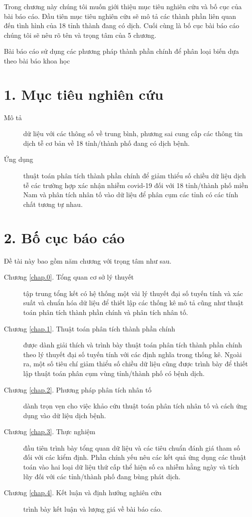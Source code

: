 Trong chương này chúng tôi muốn giới thiệu mục tiêu nghiên cứu và bố cục của bài báo cáo. Đầu tiên mục tiêu nghiên cứu sẽ mô tả các thành phần liên quan đến tình hình của 18 tỉnh thành đang có dịch. Cuối cùng là bố cục bài báo cáo chúng tôi sẽ nêu rõ tên và trọng tâm của 5 chương.

Bài báo cáo sử dụng các phương pháp thành phần chính để phân loại biến dựa theo bài báo khoa học \cite{ref}
\section*{1. Mục tiêu nghiên cứu}

\begin{description}
	\item[Mô tả] dữ liệu với các thông số về trung bình, phương sai cung cấp các thông tin dịch tễ cơ bản về 18 tỉnh/thành phố đang có dịch bệnh.
	\item[Ứng dụng] thuật toán phân tích thành phần chính để giảm thiểu số chiều dữ liệu dịch tễ các trường hợp xác nhận nhiễm covid-19 đối với 18 tỉnh/thành phố miền Nam và phân tích nhân tố vào dữ liệu để phân cụm các tỉnh có các tính chất tương tự nhau.
\end{description}

\section*{2. Bố cục báo cáo}

Đề tài này bao gồm năm chương với trọng tâm như sau.

\begin{description}
	\item[Chương \ref{chap.0}. Tổng quan cơ sở lý thuyết] tập trung tổng kết có hệ thống một vài lý thuyết đại số tuyến tính và xác suất và chuẩn hóa dữ liệu để thiết lập các thống kê mô tả cũng như thuật toán phân tích thành phần chính và phân tích nhân tố. 
	\item[Chương \ref{chap.1}. Thuật toán phân tích thành phần chính] được dành giải thích và trình bày thuật toán phân tích thành phần chính theo lý thuyết đại số tuyến tính với các định nghĩa trong thống kê. Ngoài ra, một số tiêu chí giảm thiểu số chiều dữ liệu cũng được trình bày để thiết lập thuật toán phân cụm vùng tỉnh/thành phố có bệnh dịch. 
	\item[Chương \ref{chap.2}. Phương pháp phân tích nhân tố] dành trọn vẹn cho việc khảo cứu thuật toán phân tích nhân tố và cách ứng dụng vào dữ liệu dịch bệnh.
	\item[Chương \ref{chap.3}. Thực nghiệm] đầu tiên trình bày tổng quan dữ liệu và các tiêu chuẩn đánh giá tham số đối với các kiểm định. Phần chính yếu nêu các kết quả ứng dụng các thuật toán vào hai loại dữ liệu thứ cấp thể hiện số ca nhiễm hằng ngày và tích lũy đối với các tỉnh/thành phố đang bùng phát dịch.
	\item[Chương \ref{chap.4}. Kết luận và định hướng nghiên cứu] trình bày kết luận và lượng giá về bài báo cáo.
\end{description}
